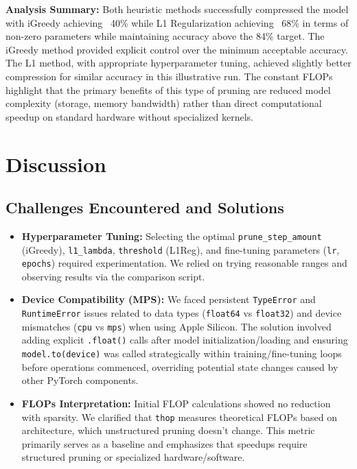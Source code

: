 \documentclass[conference]{IEEEtran} %
\begin{document}
\textbf{Analysis Summary:}
Both heuristic methods successfully compressed the model with iGreedy achieving ~40\% while L1 Regularization achieving ~68\% in terms of non-zero parameters while maintaining accuracy above the 84\% target. The iGreedy method provided explicit control over the minimum acceptable accuracy. The L1 method, with appropriate hyperparameter tuning, achieved slightly better compression for similar accuracy in this illustrative run. The constant FLOPs highlight that the primary benefits of this type of pruning are reduced model complexity (storage, memory bandwidth) rather than direct computational speedup on standard hardware without specialized kernels.

\section{Discussion}

\subsection{Challenges Encountered and Solutions}
\begin{itemize}
    \item \textbf{Hyperparameter Tuning:} Selecting the optimal \texttt{prune\_step\_amount} (iGreedy), \texttt{l1\_lambda}, \texttt{threshold} (L1Reg), and fine-tuning parameters (\texttt{lr}, \texttt{epochs}) required experimentation. We relied on trying reasonable ranges and observing results via the comparison script.
    \item \textbf{Device Compatibility (MPS):} We faced persistent \texttt{TypeError} and \texttt{RuntimeError} issues related to data types (\texttt{float64} vs \texttt{float32}) and device mismatches (\texttt{cpu} vs \texttt{mps}) when using Apple Silicon. The solution involved adding explicit \texttt{.float()} calls after model initialization/loading and ensuring \texttt{model.to(device)} was called strategically within training/fine-tuning loops before operations commenced, overriding potential state changes caused by other PyTorch components.
    \item \textbf{FLOPs Interpretation:} Initial FLOP calculations showed no reduction with sparsity. We clarified that \texttt{thop} measures theoretical FLOPs based on architecture, which unstructured pruning doesn't change. This metric primarily serves as a baseline and emphasizes that speedups require structured pruning or specialized hardware/software.
\end{itemize}
\end{document}
